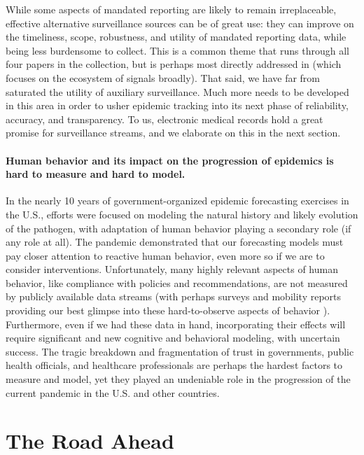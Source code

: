 \documentclass{article}
\begin{document}
While some aspects of mandated reporting are likely to remain irreplaceable,
effective alternative surveillance sources can be of great use: they can improve
on the timeliness, scope, robustness, and utility of mandated reporting data,
while being less burdensome to collect.  This is a common theme that runs
through all four papers in the collection, but is perhaps most directly
addressed in \citep{Reinhart:2021} (which focuses on the ecosystem of signals
broadly).  That said, we have far from saturated the utility of auxiliary
surveillance.  Much more needs to be developed in this area in order to usher
epidemic tracking into its next phase of reliability, accuracy, and
transparency.  To us, electronic medical records hold a great promise for
surveillance streams, and we elaborate on this in the next section.

\paragraph{Human behavior and its impact on the progression of epidemics is hard
  to measure and hard to model.}

In the nearly 10 years of government-organized epidemic forecasting exercises in
the U.S., efforts were focused on modeling the natural history and likely
evolution of the pathogen, with adaptation of human behavior playing a secondary
role (if any role at all).  The pandemic demonstrated that our forecasting
models must pay closer attention to reactive human behavior, even more so if we
are to consider interventions.  Unfortunately, many highly relevant aspects of
human behavior, like compliance with policies and recommendations, are not
measured by publicly available data streams (with perhaps surveys and mobility  
reports providing our best glimpse into these hard-to-observe aspects of
behavior \citep{Bilinski:2021}).  Furthermore, even if we had these data in
hand, incorporating their effects will require significant and new cognitive and 
behavioral modeling, with uncertain success.  The tragic breakdown and
fragmentation of trust in governments, public health officials, and healthcare
professionals are perhaps the hardest factors to measure and model, yet they
played an undeniable role in the progression of the current pandemic in the
U.S. and other countries. 

\section{The Road Ahead}
\end{document}
